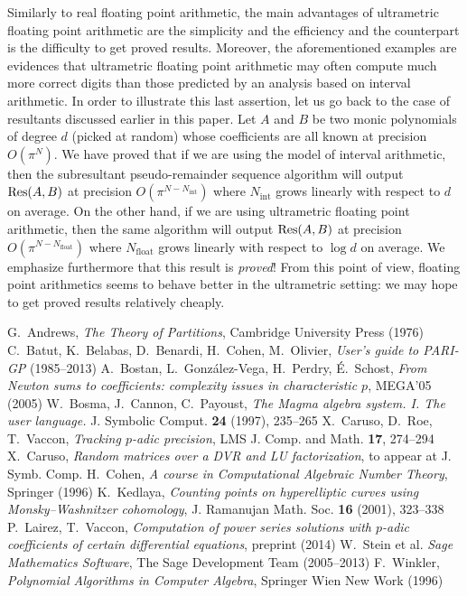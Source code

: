 \documentclass{article}
\begin{document}
Similarly to real floating point arithmetic, the main advantages of 
ultrametric floating point arithmetic are the simplicity and the 
efficiency and the counterpart is the difficulty to get proved results. 
Moreover, the aforementioned examples are evidences that ultrametric 
floating point arithmetic may often compute much more correct digits 
than those predicted by an analysis based on interval arithmetic. In 
order to illustrate this last assertion, let us go back to the case of 
resultants discussed earlier in this paper. Let $A$ and $B$ be two monic 
polynomials of degree $d$ (picked at random) whose coefficients are all 
known at precision $O(\pi^N)$. We have proved that if we are using the
model of interval arithmetic, then the subresultant pseudo-remainder
sequence algorithm will output $\text{\rm Res}(A,B)$ at precision 
$O(\pi^{N-N_{\text{int}}})$ where $N_{\text{int}}$ grows linearly 
with respect to $d$ on average. On the other hand, if we are using 
ultrametric floating point arithmetic, then the same algorithm will
output $\text{\rm Res}(A,B)$ at precision $O(\pi^{N-N_{\text{float}}})$ where 
$N_{\text{float}}$ grows linearly with respect to $\log d$ on average.
We emphasize furthermore that this result is \emph{proved}! From this
point of view, floating point arithmetics seems to behave better in
the ultrametric setting: we may hope to get proved results relatively
cheaply.

\begin{thebibliography}{99}
{}
  G.~Andrews,
  \emph{The Theory of Partitions},
  Cambridge University Press (1976)
  C.~Batut, K.~Belabas, D.~Benardi, H.~Cohen, M.~Olivier, 
  \emph{User’s guide to PARI-GP} (1985--2013)
  A.~Bostan, L.~Gonz\'alez-Vega, H.~Perdry, É.~Schost, 
  \emph{From Newton sums to coefficients: complexity issues in characteristic $p$}, 
  MEGA’05 (2005)
  W.~Bosma, J.~Cannon, C.~Payoust, 
  \emph{The Magma algebra system. I. The user language.}
  J. Symbolic Comput. {\bf 24} (1997), 235--265
  X.~Caruso, D.~Roe, T.~Vaccon,
  \emph{Tracking $p$-adic precision},
  LMS J. Comp. and Math. {\bf 17}, 274--294
  X.~Caruso,
  \emph{Random matrices over a DVR and LU factorization},
  to appear at J. Symb. Comp.
  H.~Cohen,
  \emph{A course in Computational Algebraic Number Theory},
  Springer (1996)
  K.~Kedlaya,
  \emph{Counting points on hyperelliptic curves using Monsky--Washnitzer cohomology}, 
  J. Ramanujan Math. Soc. {\bf 16} (2001), 323--338
  P.~Lairez, T.~Vaccon,
  \emph{Computation of power series solutions with $p$-adic coefficients of certain differential equations},
  preprint (2014)
  W.~Stein et al.
  \emph{Sage Mathematics Software}, 
  The Sage Development Team (2005--2013)
  F.~Winkler,
  \emph{Polynomial Algorithms in Computer Algebra},
  Springer Wien New Work (1996)
\bibitem{}
\end{thebibliography}
\end{document}
